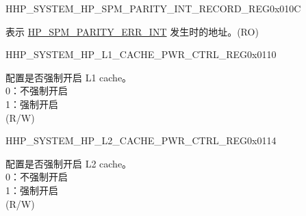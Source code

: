 \begin{register}{H}{HP\_SYSTEM\_HP\_SPM\_PARITY\_INT\_RECORD\_REG}{0x010C}\label{regdesc:HPSYSTEMHPSPMPARITYINTRECORDREG}
%
%
\regnewline%
\begin{regdesc}\begin{reglist}
\label{fielddesc:HPSYSTEMHPSPMPARITYERRINTADDR}\item [HP\_SYSTEM\_HP\_SPM\_PARITY\_ERR\_INT\_ADDR] 表示 \hyperref[tab:sysreg-int-sources]{HP\_SPM\_PARITY\_ERR\_INT} 发生时的地址。(RO)
\end{reglist}\end{regdesc}
\end{register}


\begin{register}{H}{HP\_SYSTEM\_HP\_L1\_CACHE\_PWR\_CTRL\_REG}{0x0110}\label{regdesc:HPSYSTEMHPL1CACHEPWRCTRLREG}
%
%
\regnewline%
\begin{regdesc}\begin{reglist}
\label{fielddesc:HPSYSTEML1CACHEMEMFO}\item [HP\_SYSTEM\_L1\_CACHE\_MEM\_FO] 配置是否强制开启 L1 cache。\\
0：不强制开启\\
1：强制开启\\
(R/W)
\end{reglist}\end{regdesc}
\end{register}


\begin{register}{H}{HP\_SYSTEM\_HP\_L2\_CACHE\_PWR\_CTRL\_REG}{0x0114}\label{regdesc:HPSYSTEMHPL2CACHEPWRCTRLREG}
%
%
\regnewline%
\begin{regdesc}\begin{reglist}
\label{fielddesc:HPSYSTEML2CACHEMEMFO}\item [HP\_SYSTEM\_L2\_CACHE\_MEM\_FO] 配置是否强制开启 L2 cache。\\
0：不强制开启\\
1：强制开启\\
(R/W)
\end{reglist}\end{regdesc}
\end{register}


